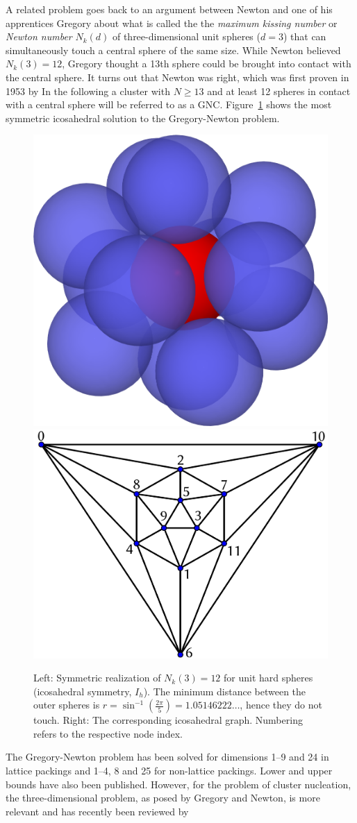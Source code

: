 A related problem goes back to an argument between Newton and one of his
apprentices Gregory about what is called the the \emph{maximum kissing number}
or \emph{Newton number} $N_k(d)$ of three-dimensional unit spheres ($d=3$) that
can simultaneously touch a central sphere of the same
size.\autocite{Pfender_KissingNumbersSphere_2004} While Newton believed
$N_k(3)=12$, Gregory thought a 13th sphere could be brought into contact with
the central sphere. It turns out that Newton was right, which was first proven
in 1953 by
\citeauthor{Schutte_ProblemdreizehnKugeln_1952}\autocite{Schutte_ProblemdreizehnKugeln_1952}
In the following a cluster with $N\geq 13$ and at least 12 spheres in contact
with a central sphere will be referred to as a \acf{GNC}. Figure~\ref{fig:GN}
shows the most symmetric icosahedral solution to the Gregory-Newton problem.
%
\begin{figure}[htb]
    \centering
    \includegraphics[width=.4\textwidth]{gregory-newton/Kissing-3d.png} \quad
    \includegraphics[width=.5\textwidth]{gregory-newton/ico.pdf}
    \caption{Left: Symmetric realization of $N_k(3)=12$ for unit hard spheres
    (icosahedral symmetry, $I_h$). The minimum distance between the outer
    spheres is $r=\sin^{-1}\left(\frac{2\pi}{5}\right)=1.05146222\dots$,
    hence they do not touch. Right: The corresponding icosahedral graph.
    Numbering refers to the respective node index.}
    \label{fig:GN}
\end{figure}
%
The Gregory-Newton problem has been solved for dimensions 1--9 and 24 in lattice
packings and 1--4, 8 and 25 for non-lattice
packings.\autocite{Musin_kissingnumberfour_2008,Conway_SpherePackingsLattices_1999,Musin_proof24cellconjecture_2018}
Lower and upper bounds have also been
published.\autocite{Mittelmann_Highaccuracysemidefiniteprogramming_2010,Conway_SpherePackingsLattices_1999}
However, for the problem of cluster nucleation, the three-dimensional problem,
as posed by Gregory and Newton, is more relevant and has recently been reviewed
by
\citeauthor{Kusner_ConfigurationSpacesEqual_2018}\autocite{Kusner_ConfigurationSpacesEqual_2018}

